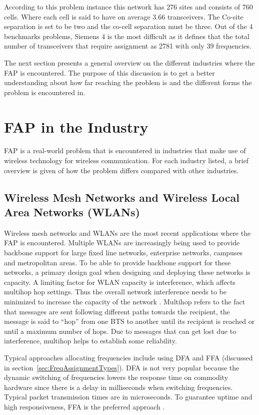 According to this problem instance this network has 276 sites and consists of 760 cells. Where each cell is said to have on average 3.66 transceivers. The Co-site separation is set to be two and the co-cell separation must be three. Out of the 4 benchmarks problems, Siemens 4 is the most difficult as it defines that the total number of transceivers that require assignment as 2781 with only 39 frequencies.

The next section presents a general overview on the different industries where the \gls{FAP} is encountered. The purpose of this discussion is to get a better understanding about how far reaching the problem is and the different forms the problem is encountered in.

\section{FAP in the Industry}
\label{sec:FAPIndustry}
FAP is a real-world problem that is encountered in industries that make use of wireless technology for wireless communication\cite{Karen2004}. For each industry listed, a brief overview is given of how the problem differs compared with other industries. 

\subsection{Wireless Mesh Networks and Wireless Local Area Networks (WLANs)}
Wireless mesh networks and WLANs are the most recent applications where the \gls{FAP} is encountered. 
Multiple WLANs are increasingly being used to provide backbone support for large fixed line networks, enterprise networks, campuses and metropolitan areas\cite{MultiradioMeshNetworks}. To be able to provide backbone support for these networks, a primary design goal when designing and deploying these networks is capacity\cite{MultiradioMeshNetworks}. A limiting factor for WLAN capacity is interference, which affects multihop hop settings. Thus the overall network interference needs to be minimized to increase the capacity of the network \cite{MultiradioMeshNetworks}. Multihop refers to the fact that messages are sent following different paths towards the recipient, the message is said to ``hop'' from one BTS to another until its recipient is reached or until a maximum number of hops. Due to messages that can get lost due to interference, multihop helps to establish some reliability\cite{WirelessDigitalCommunications}.

Typical approaches allocating frequencies include using \gls{DFA} and \gls{FFA} (discussed in section~\ref{sec:FreqAssignmentTypes}). \gls{DFA} is not very popular because the dynamic switching of frequencies lowers the response time on commodity hardware since there is a delay in milliseconds when switching frequencies. Typical packet transmission times are in microseconds. To guarantee uptime and high responsiveness, \gls{FFA} is the preferred approach \cite{MultiradioMeshNetworks}.

